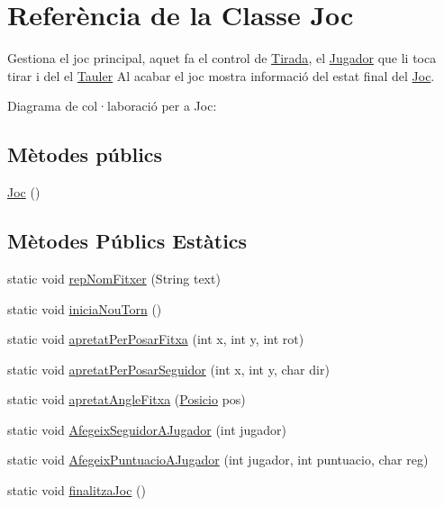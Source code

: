 \hypertarget{class_joc}{}\section{Referència de la Classe Joc}
\label{class_joc}


Gestiona el joc principal, aquet fa el control de \mbox{\hyperlink{class_tirada}{Tirada}}, el \mbox{\hyperlink{class_jugador}{Jugador}} que li toca tirar i del el \mbox{\hyperlink{class_tauler}{Tauler}} Al acabar el joc mostra informació del estat final del \mbox{\hyperlink{class_joc}{Joc}}.  




Diagrama de col·laboració per a Joc\+:
\subsection*{Mètodes públics}
\begin{DoxyCompactItemize}
\item 
\mbox{\hyperlink{class_joc_a22b2f8a3a689e97aa5245060187504e7}{Joc}} ()
\end{DoxyCompactItemize}
\subsection*{Mètodes Públics Estàtics}
\begin{DoxyCompactItemize}
\item 
static void \mbox{\hyperlink{class_joc_aa164cac0c602f63ff7e8860db7d06649}{rep\+Nom\+Fitxer}} (String text)
\item 
static void \mbox{\hyperlink{class_joc_aae62a162e3ae1cae45dea616914fcaba}{inicia\+Nou\+Torn}} ()
\item 
static void \mbox{\hyperlink{class_joc_a90b306ce9d339455a5f6e5d2decf90f1}{apretat\+Per\+Posar\+Fitxa}} (int x, int y, int rot)
\item 
static void \mbox{\hyperlink{class_joc_a72eed3f92b818584d664717fbb05d153}{apretat\+Per\+Posar\+Seguidor}} (int x, int y, char dir)
\item 
static void \mbox{\hyperlink{class_joc_a1a732f8c5fe455e04c76f38259eb00ba}{apretat\+Angle\+Fitxa}} (\mbox{\hyperlink{class_posicio}{Posicio}} pos)
\item 
static void \mbox{\hyperlink{class_joc_a7b2aa3cddde39037414f87df367b3599}{Afegeix\+Seguidor\+A\+Jugador}} (int jugador)
\item 
static void \mbox{\hyperlink{class_joc_ae969b3e16360a36ada26dffbb184fc33}{Afegeix\+Puntuacio\+A\+Jugador}} (int jugador, int puntuacio, char reg)
\item 
static void \mbox{\hyperlink{class_joc_a98725350a7727b56245c526c405c7629}{finalitza\+Joc}} ()
\end{DoxyCompactItemize}
